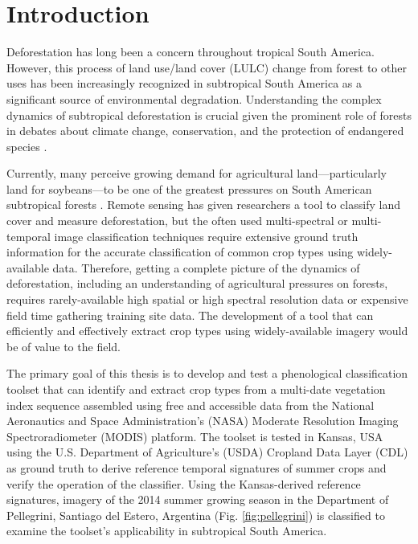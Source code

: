 \chapter{Introduction}

Deforestation has long been a concern throughout tropical South America. However, this process of land use/land cover (LULC) change from forest to other uses has been increasingly recognized in subtropical South America as a significant source of environmental degradation. Understanding the complex dynamics of subtropical deforestation is crucial given the prominent role of forests in debates about climate change, conservation, and the protection of endangered species \autocites{geist2002proximate}{zak2004do-subtropical}{bonnie2000counting}{houghton1994the-worldwide}{sala2000global}.

Currently, many perceive growing demand for agricultural land---particularly land for soybeans---to be one of the greatest pressures on South American subtropical forests \autocites{pengue2005transgenic}{grau2005agriculture}{altieri2006gm-soybean:}. Remote sensing has given researchers a tool to classify land cover and measure deforestation, but the often used multi-spectral or multi-temporal image classification techniques require extensive ground truth information for the accurate classification of common crop types using widely-available data. Therefore, getting a complete picture of the dynamics of deforestation, including an understanding of agricultural pressures on forests, requires rarely-available high spatial or high spectral resolution data \autocite{senay2000using} or expensive field time gathering training site data. The development of a tool that can efficiently and effectively extract crop types using widely-available imagery would be of value to the field.

The primary goal of this thesis is to develop and test a phenological classification toolset that can identify and extract crop types from a multi-date vegetation index sequence assembled using free and accessible data from the National Aeronautics and Space Administration’s (NASA) Moderate Resolution Imaging Spectroradiometer (MODIS) platform. The toolset is tested in Kansas, USA using the U.S. Department of Agriculture's (USDA) Cropland Data Layer (CDL) as ground truth to derive reference temporal signatures of summer crops and verify the operation of the classifier. Using the Kansas-derived reference signatures, imagery of the 2014 summer growing season in the Department of Pellegrini, Santiago del Estero, Argentina (Fig. \ref{fig:pellegrini}) is classified to examine the toolset's applicability in subtropical South America.

